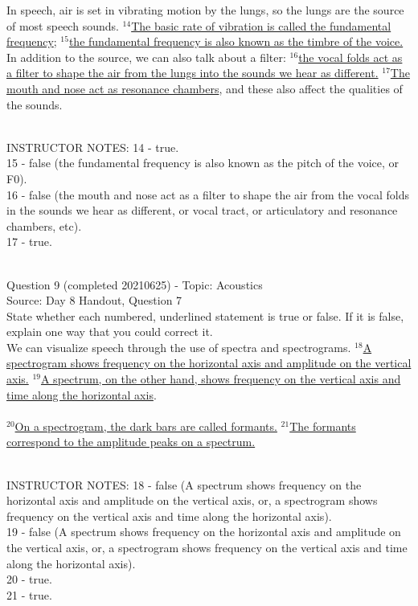 \documentclass[12pt]{article}
\begin{document}
In speech, air is set in vibrating motion by the lungs, so the lungs are the source of most speech sounds. $^{14}$\ul{The basic rate of vibration is called the fundamental frequency}; $^{15}$\ul{the fundamental frequency is also known as the timbre of the voice.} In addition to the source, we can also talk about a filter: $^{16}$\ul{the vocal folds act as a filter to shape the air from the lungs into the sounds we hear as different.} $^{17}$\ul{The mouth and nose act as resonance chambers}, and these also affect the qualities of the sounds.


~\\
INSTRUCTOR NOTES: 14 - true.\\15 - false (the fundamental frequency is also known as the pitch of the voice, or F0).\\16 - false (the mouth and nose act as a filter to shape the air from the vocal folds in the sounds we hear as different, or vocal tract, or articulatory and resonance chambers, etc).\\17 - true.


~\\

{\large Question 9} (completed 20210625) - Topic: Acoustics\\
Source: Day 8 Handout, Question 7\\

State whether each numbered, underlined statement is true or false. If it is false, explain one way that you could correct it.\\

We can visualize speech through the use of spectra and spectrograms. $^{18}$\ul{A spectrogram shows frequency on the horizontal axis and amplitude on the vertical axis.} $^{19}$\ul{A spectrum, on the other hand, shows frequency on the vertical axis and time along the horizontal axis}.\\\\$^{20}$\ul{On a spectrogram, the dark bars are called formants.} $^{21}$\ul{The formants correspond to the amplitude peaks on a spectrum.}


~\\
INSTRUCTOR NOTES: 18 - false (A spectrum shows frequency on the horizontal axis and amplitude on the vertical axis, or, a spectrogram shows frequency on the vertical axis and time along the horizontal axis).\\19 - false (A spectrum shows frequency on the horizontal axis and amplitude on the vertical axis, or, a spectrogram shows frequency on the vertical axis and time along the horizontal axis).\\20 - true.\\21 - true.
\end{document}
